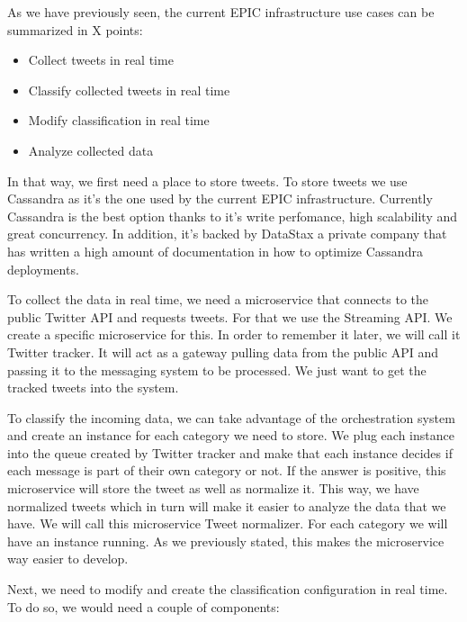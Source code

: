 As we have previously seen, the current EPIC infrastructure use cases can be summarized in X points:

\begin{itemize}
	\item Collect tweets in real time
	\item Classify collected tweets in real time
	\item Modify classification in real time
	\item Analyze collected data
\end{itemize}


In that way, we first need a place to store tweets. To store tweets we use Cassandra as it’s the one used by the current EPIC infrastructure. Currently Cassandra is the best option thanks to it’s write perfomance, high scalability and great concurrency. In addition, it’s backed by DataStax a private company that has written a high amount of documentation in how to optimize Cassandra deployments.

To collect the data in real time, we need a microservice that connects to the public Twitter API and requests tweets. For that we use the Streaming API. We create a specific microservice for this. In order to remember it later, we will call it Twitter tracker. It will act as a gateway pulling data from the public API and passing it to the messaging system to be processed. We just want to get the tracked tweets into the system.

To classify the incoming data, we can take advantage of the orchestration system and create an instance for each category we need to store. We plug each instance into the queue created by Twitter tracker and make that each instance decides if each message is part of their own category or not. If the answer is positive, this microservice will store the tweet as well as normalize it. This way, we have normalized tweets which in turn will make it easier to analyze the data that we have. We will call this microservice Tweet normalizer. For each category we will have an instance running. As we previously stated, this makes the microservice way easier to develop.

Next, we need to modify and create the classification configuration in real time. To do so, we would need a couple of components:

